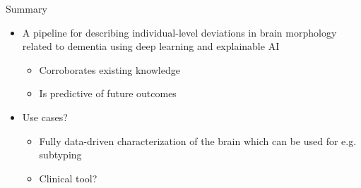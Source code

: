 \documentclass[t]{beamer}
\begin{document}
	\begin{frame}{Summary}
		\vfill
		\centering
		\begin{itemize}
			\item A pipeline for describing individual-level deviations in brain morphology related to dementia using deep learning and explainable AI
			\begin{itemize}
				\item Corroborates existing knowledge
				\item Is predictive of future outcomes
			\end{itemize}
			\item Use cases?
			\begin{itemize}
				\item Fully data-driven characterization of the brain which can be used for e.g. subtyping
				\item Clinical tool?
			\end{itemize}
		\end{itemize}
		\vfill
	\end{frame}
\end{document}
